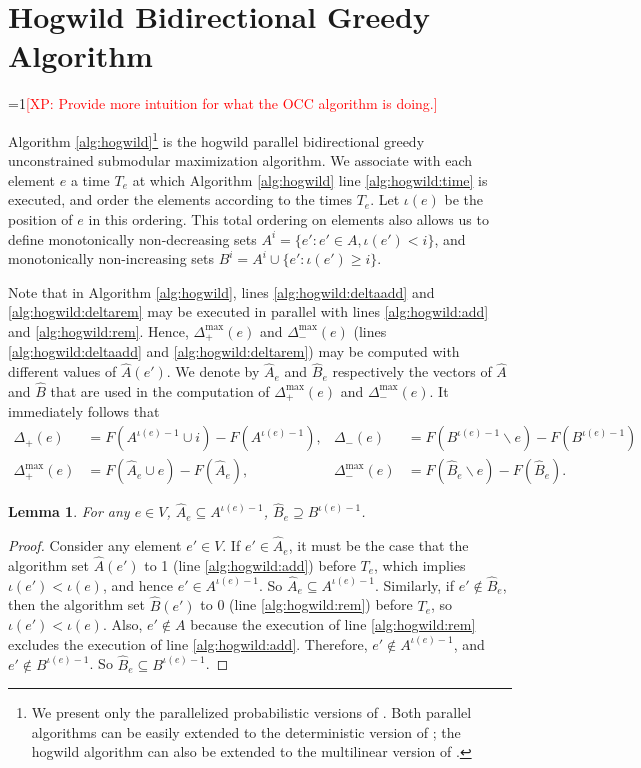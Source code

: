 \documentclass{article} %
\newtheorem{lem}[thm]{Lemma}
\newcommand{\Comments}{1}
\newcommand{\note}[2]{\ifnum\Comments=1\textcolor{#1}{#2}\fi}
\newcommand{\xinghao}[1]{\note{red}{[XP: #1]}}
\begin{document}
\section{Hogwild Bidirectional Greedy Algorithm}
\xinghao{Provide more intuition for what the OCC algorithm is doing.}

Algorithm \ref{alg:hogwild}\footnote{We present only the parallelized probabilistic versions of \cite{buchbinder2012}. Both parallel algorithms can be easily extended to the deterministic version of \cite{buchbinder2012}; the hogwild algorithm can also be extended to the multilinear version of \cite{buchbinder2012}.} is the hogwild parallel bidirectional greedy unconstrained submodular maximization algorithm.
We associate with each element $e$ a time $T_e$ at which Algorithm \ref{alg:hogwild} line \ref{alg:hogwild:time} is executed, and order the elements according to the times $T_e$.
Let $\iota(e)$ be the position of $e$ in this ordering.
This total ordering on elements also allows us to define monotonically non-decreasing sets $A^i = \{e' : e' \in A, \iota(e') < i\}$, and monotonically non-increasing sets $B^i = A^i \cup \{e': \iota(e') \geq i\}$.

Note that in Algorithm \ref{alg:hogwild}, lines \ref{alg:hogwild:deltaadd} and \ref{alg:hogwild:deltarem} may be executed in parallel with lines \ref{alg:hogwild:add} and \ref{alg:hogwild:rem}.
Hence, $\Delta_+^{\max}(e)$ and $\Delta_-^{\max}(e)$ (lines \ref{alg:hogwild:deltaadd} and \ref{alg:hogwild:deltarem}) may be computed with different values of $\hat{A}(e')$.
We denote by $\hat{A}_e$ and $\hat{B}_e$ respectively the vectors of $\hat{A}$ and $\hat{B}$ that are used in the computation of $\Delta_+^{\max}(e)$ and $\Delta_-^{\max}(e)$.
It immediately follows that
\begin{align*}
  \Delta_{+}       (e) &= F(A^{\iota(e)-1}\cup i) - F(A^{\iota(e)-1}),
& \Delta_{-}       (e) &= F(B^{\iota(e)-1}\backslash e) - F(B^{\iota(e)-1})\\
  \Delta_{+}^{\max}(e) &= F(\hat{A}_e\cup e) - F(\hat{A}_e),
& \Delta_{-}^{\max}(e) &= F(\hat{B}_e\backslash e) - F(\hat{B}_e).
\end{align*}



\begin{lem}\label{lem:set_bound} For any $e\in V$, $\hat{A}_e \subseteq A^{\iota(e)-1}$, $\hat{B}_e \supseteq B^{\iota(e)-1}$.
\end{lem}
\begin{proof}
Consider any element $e'\in V$.
If $e'\in \hat{A}_e$, it must be the case that the algorithm set $\hat{A}(e')$ to 1 (line \ref{alg:hogwild:add}) before $T_e$, which implies $\iota(e') < \iota(e)$, and hence $e' \in A^{\iota(e)-1}$.
So $\hat{A}_e \subseteq A^{\iota(e)-1}$.
Similarly, if $e'\not\in \hat{B}_e$, then the algorithm set $\hat{B}(e')$ to 0 (line \ref{alg:hogwild:rem}) before $T_e$, so $\iota(e') < \iota(e)$.
Also, $e'\not\in A$ because the execution of line \ref{alg:hogwild:rem} excludes the execution of line \ref{alg:hogwild:add}.
Therefore, $e'\not\in A^{\iota(e)-1}$, and $e'\not\in B^{\iota(e)-1}$.
So $\hat{B}_e \subseteq B^{\iota(e)-1}$.
\end{proof}
\end{document}
